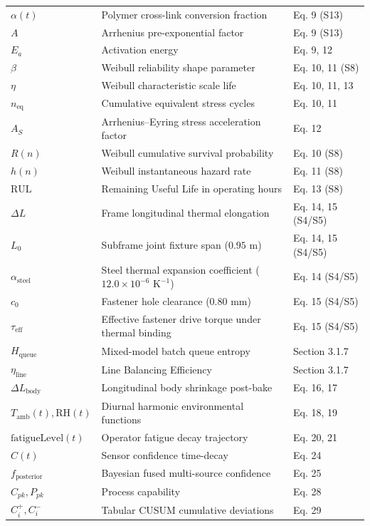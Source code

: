 \documentclass[11pt]{article}
\begin{document}
\begin{center}
\begin{longtable}{p{2.6cm}p{6.6cm}p{2.5cm}}
$\alpha(t)$ & Polymer cross-link conversion fraction & Eq. 9 (S13) \\
$A$ & Arrhenius pre-exponential factor & Eq. 9 (S13) \\
$E_a$ & Activation energy & Eq. 9, 12 \\
$\beta$ & Weibull reliability shape parameter & Eq. 10, 11 (S8) \\
$\eta$ & Weibull characteristic scale life & Eq. 10, 11, 13 \\
$n_{\text{eq}}$ & Cumulative equivalent stress cycles & Eq. 10, 11 \\
$A_S$ & Arrhenius--Eyring stress acceleration factor & Eq. 12 \\
$R(n)$ & Weibull cumulative survival probability & Eq. 10 (S8) \\
$h(n)$ & Weibull instantaneous hazard rate & Eq. 11 (S8) \\
$\text{RUL}$ & Remaining Useful Life in operating hours & Eq. 13 (S8) \\
$\Delta L$ & Frame longitudinal thermal elongation & Eq. 14, 15 (S4/S5) \\
$L_0$ & Subframe joint fixture span ($0.95\text{ m}$) & Eq. 14, 15 (S4/S5) \\
$\alpha_{\text{steel}}$ & Steel thermal expansion coefficient ($12.0\times 10^{-6}\text{ K}^{-1}$) & Eq. 14 (S4/S5) \\
$c_0$ & Fastener hole clearance ($0.80\text{ mm}$) & Eq. 15 (S4/S5) \\
$\tau_{\text{eff}}$ & Effective fastener drive torque under thermal binding & Eq. 15 (S4/S5) \\
$H_{\text{queue}}$ & Mixed-model batch queue entropy & Section 3.1.7 \\
$\eta_{\text{line}}$ & Line Balancing Efficiency & Section 3.1.7 \\
$\Delta L_{\text{body}}$ & Longitudinal body shrinkage post-bake & Eq. 16, 17 \\
$T_{\text{amb}}(t), \text{RH}(t)$ & Diurnal harmonic environmental functions & Eq. 18, 19 \\
$\text{fatigueLevel}(t)$ & Operator fatigue decay trajectory & Eq. 20, 21 \\
$C(t)$ & Sensor confidence time-decay & Eq. 24 \\
$f_{\text{posterior}}$ & Bayesian fused multi-source confidence & Eq. 25 \\
$C_{pk}, P_{pk}$ & Process capability & Eq. 28 \\
$C_i^+, C_i^-$ & Tabular CUSUM cumulative deviations & Eq. 29 \\

\end{longtable}
\end{center}
\end{document}
